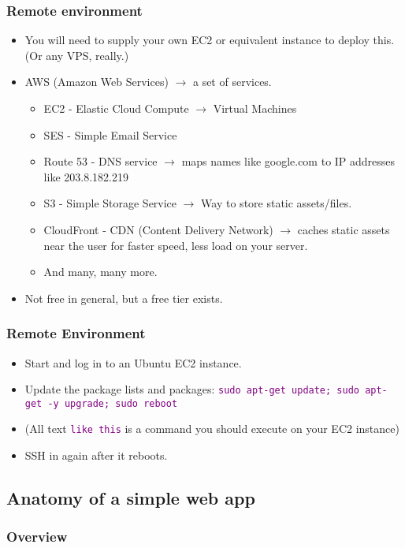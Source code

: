 \documentclass{beamer}
\newcommand\aws[1]{\textcolor{purple}{\texttt{#1}}}
\begin{document}
\begin{frame}
  \frametitle{Remote environment}
  
  \begin{itemize}
  \item You will need to supply your own EC2 or equivalent instance to
    deploy this. (Or any VPS, really.)
  \item AWS (Amazon Web Services) $\to$ a set of services.
    \begin{itemize}
    \item EC2 - Elastic Cloud Compute $\to$ Virtual Machines
    \item SES - Simple Email Service
    \item Route 53 - DNS service $\to$ maps names like google.com to
      IP addresses like 203.8.182.219
    \item S3 - Simple Storage Service $\to$ Way to store static assets/files.
    \item CloudFront - CDN (Content Delivery Network) $\to$ caches
      static assets near the user for faster speed, less load on your
      server.
    \item And many, many more.
    \end{itemize}
  \item Not free in general, but a free tier exists.
  \end{itemize}
\end{frame}

\begin{frame}
  \frametitle{Remote Environment}
  \begin{itemize}
  \item Start and log in to an Ubuntu EC2 instance.
  \item Update the package lists and packages: \aws{sudo apt-get
      update; sudo apt-get -y upgrade; sudo reboot}
  \item (All text \aws{like this} is a command you should execute on
    your EC2 instance)
  \item SSH in again after it reboots.
  \end{itemize}
\end{frame}

\subsection{Anatomy of a simple web app}

\subsubsection{Overview}
\end{document}
